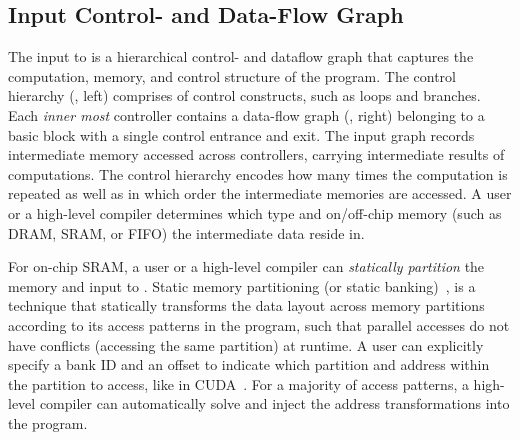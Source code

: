 \subsection{Input Control- and Data-Flow Graph}
\label{ssec:igraph}

The input to \name is a hierarchical control- and dataflow graph that captures the computation, memory, and control structure of the program. 
The control hierarchy (, left) comprises of control constructs, such as loops and branches.
Each \emph{inner most} controller contains a data-flow graph (, right) belonging to a basic block with a single control entrance and exit.
The input graph records intermediate memory accessed across controllers, carrying intermediate results of computations.
The control hierarchy encodes how many times the computation is repeated as well as in which order the intermediate memories are accessed.
A user or a high-level compiler determines which type and on/off-chip memory (such as DRAM, SRAM, or FIFO) the intermediate data reside in.

For on-chip SRAM, a user or a high-level compiler can \emph{statically partition} the memory and input to \name.
Static memory partitioning (or static banking)~\cite{poly_cong}, is a technique that statically transforms the data layout across memory partitions according 
to its access patterns in the program, such that parallel accesses do not have conflicts (accessing the same partition) at runtime.
A user can explicitly specify a bank ID and an offset to indicate which partition and address within the partition to access, like in CUDA~\cite{cuda}.
For a majority of access patterns, a high-level compiler\cite{spatial} can automatically solve and inject the address transformations into the program.
